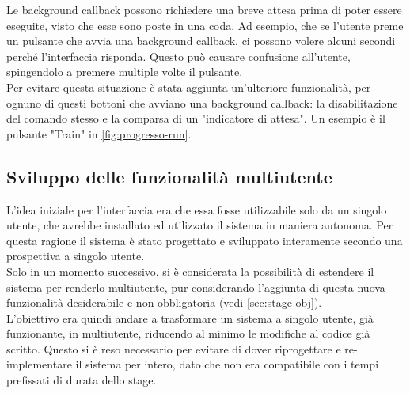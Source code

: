 Le background callback possono richiedere una breve attesa prima di poter essere eseguite, visto che esse sono poste in una coda. Ad esempio, che se l'utente preme un pulsante che avvia una background callback, ci possono volere alcuni secondi perché l'interfaccia risponda. Questo può causare confusione all'utente, spingendolo a premere multiple volte il pulsante.
\\ 
Per evitare questa situazione è stata aggiunta un'ulteriore funzionalità, per ognuno di questi bottoni che avviano una background callback: la disabilitazione del comando stesso e la comparsa di un "indicatore di attesa". Un esempio è il pulsante "Train" in \autoref{fig:progresso-run}.

\subsection{Sviluppo delle funzionalità multiutente}
L'idea iniziale per l'interfaccia era che essa fosse utilizzabile solo da un singolo utente, che avrebbe installato ed utilizzato il sistema in maniera autonoma. Per questa ragione il sistema è stato progettato e sviluppato interamente secondo una prospettiva a singolo utente. 
\\
Solo in un momento successivo, si è considerata la possibilità di estendere il sistema per renderlo multiutente, pur considerando l'aggiunta di questa nuova funzionalità desiderabile e non obbligatoria (vedi \autoref{sec:stage-obj}).
\\
L'obiettivo era quindi andare a trasformare un sistema a singolo utente, già funzionante, in multiutente, riducendo al minimo le modifiche al codice già scritto. Questo si è reso necessario per evitare di dover riprogettare e re-implementare il sistema per intero, dato che non era compatibile con i tempi prefissati di durata dello stage.



